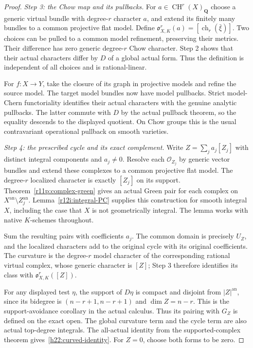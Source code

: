 \documentclass[11pt,a4paper]{article}
\theoremstyle{definition}
\theoremstyle{remark}
\begin{document}
\begin{proof}
\textit{Step 3: the Chow map and its pullbacks.}
For $a\in\operatorname{CH}^r(X)_{\mathbf Q}$ choose a generic virtual
bundle with degree-$r$ character $a$, and extend its finitely many
bundles to a common projective flat model. Define
$\mathfrak o^r_{X,K}(a)=[\operatorname{ch}_r(\bar\xi)]$.
Two choices can be pulled to a common model refinement, preserving
their metrics. Their difference has zero generic degree-$r$ Chow
character. Step 2 shows that their actual characters differ by $D$
of a global actual form. Thus the definition is independent of all
choices and is rational-linear.

For $f:X\to Y$, take the closure of its graph in projective models
and refine the source model. The target model bundles now have model
pullbacks. Strict model-Chern functoriality identifies their actual
characters with the genuine analytic pullbacks. The latter commute
with $D$ by the actual pullback theorem, so the equality descends to
the displayed quotient. On Chow groups this is the usual
contravariant operational pullback on smooth varieties.

\textit{Step 4: the prescribed cycle and its exact complement.}
Write $Z=\sum_j a_j[Z_j]$ with distinct integral components and
$a_j\ne0$. Resolve each $\mathcal O_{Z_j}$ by generic vector bundles
and extend these complexes to a common projective flat model.
The degree-$r$ localized character is exactly $[Z_j]$ on its support.
Theorem~\ref{r11p:complex-green} gives an actual Green pair for each
complex on $X^{\mathrm{an}}\setminus Z_j^{\mathrm{an}}$.
Lemma~\ref{r12i:integral-PC} supplies this construction for smooth
integral $X$, including the case that $X$ is not geometrically integral.
The lemma works with native $K$-schemes throughout.

Sum the resulting pairs with coefficients $a_j$. The common domain
is precisely $U_Z$, and the localized characters add to the original
cycle with its original coefficients. The curvature is the degree-$r$
model character of the corresponding rational virtual complex, whose
generic character is $[Z]$; Step 3 therefore identifies its class with
$\mathfrak o^r_{X,K}([Z])$.

For any displayed test $\eta$, the support of $D\eta$ is compact and
disjoint from $|Z|^{\mathrm{an}}$, since its bidegree is
$(n-r+1,n-r+1)$ and $\dim Z=n-r$. This is the support-avoidance
corollary in the actual calculus. Thus its pairing with $G_Z$ is
defined on the exact open. The global curvature term and the cycle
term are also actual top-degree integrals. The all-actual identity
from the supported-complex theorem gives~\eqref{h22:curved-identity}.
For $Z=0$, choose both forms to be zero.
\end{proof}
\end{document}
